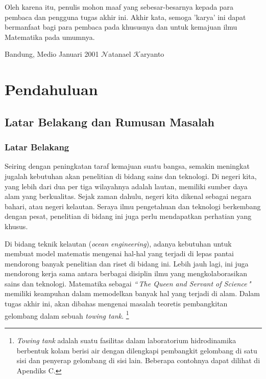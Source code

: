 \documentclass[12pt,a4paper]{report}
\begin{document}
Oleh karena itu, penulis mohon maaf yang sebesar-besarnya kepada
para pembaca dan pengguna tugas akhir ini. Akhir kata, semoga
'karya' ini dapat bermanfaat bagi para pembaca pada khususnya dan
untuk kemajuan ilmu Matematika pada umumnya.

\vspace{0.4 in} \hspace*{2 in} Bandung, Medio Januari 2001 \vspace{0.4 in}%
\newline
\hspace*{3 in}\textbf{$\mathcal{N}$}atanael
\textbf{$\mathcal{K}$}aryanto

\newpage
\pagestyle{headings} \setcounter{page}{9}
 \tableofcontents

\newpage
{} \listoffigures

\chapter{Pendahuluan}


\section{Latar Belakang dan Rumusan Masalah}

\subsection{Latar Belakang}

Seiring dengan peningkatan taraf kemajuan suatu bangsa, semakin meningkat
jugalah kebutuhan akan penelitian di bidang sains dan teknologi. Di negeri
kita, yang lebih dari dua per tiga wilayahnya adalah lautan, memiliki sumber
daya alam yang berkualitas. Sejak zaman dahulu, negeri kita dikenal sebagai
negara bahari, atau negeri kelautan. Seraya ilmu pengetahuan dan teknologi
berkembang dengan pesat, penelitian di bidang ini juga perlu mendapatkan
perhatian yang khusus.

Di bidang teknik kelautan (\textit{ocean engineering}), adanya kebutuhan
untuk membuat model matematis mengenai hal-hal yang terjadi di lepas pantai
mendorong banyak penelitian dan riset di bidang ini. Lebih jauh lagi, ini
juga mendorong kerja sama antara berbagai disiplin ilmu yang
mengkolaborasikan sains dan teknologi. Matematika sebagai \textit{``\,The
Queen and Servant of Science\,"} memiliki keampuhan dalam memodelkan banyak
hal yang terjadi di alam. Dalam tugas akhir ini, akan dibahas mengenai
masalah teoretis pembangkitan gelombang dalam sebuah \textit{towing tank}.%
\footnote[1]{\textit{Towing tank} adalah suatu fasilitas dalam laboratorium
hidrodinamika berbentuk kolam berisi air dengan dilengkapi pembangkit
gelombang di satu sisi dan penyerap gelombang di sisi lain. Beberapa
contohnya dapat dilihat di Apendiks C.}
\end{document}
